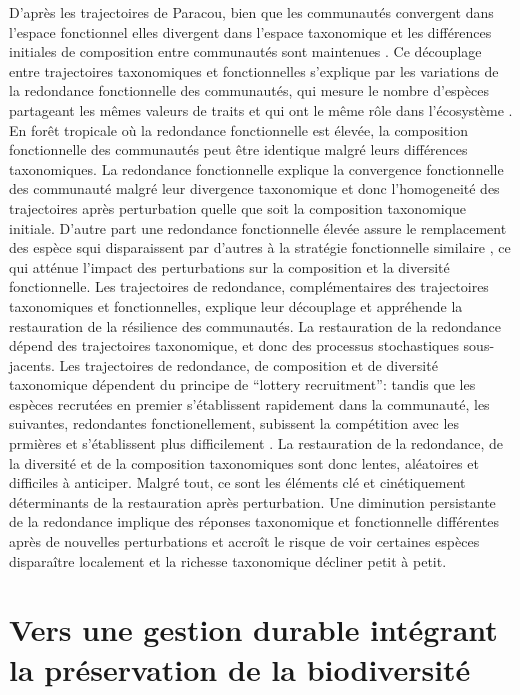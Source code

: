 \documentclass[
  11pt,
  french,
  A4paper,
  extrafontsizes,onecolumn,openright
  ]{memoir}
\begin{document}
D'après les trajectoires de Paracou, bien que les communautés convergent
dans l'espace fonctionnel elles divergent dans l'espace taxonomique et
les différences initiales de composition entre communautés sont
maintenues \autocite{Fukami2005}. Ce découplage entre trajectoires
taxonomiques et fonctionnelles s'explique par les variations de la
redondance fonctionnelle des communautés, qui mesure le nombre d'espèces
partageant les mêmes valeurs de traits et qui ont le même rôle dans
l'écosystème \autocite{Bellwood2006}. En forêt tropicale où la
redondance fonctionnelle est élevée, la composition fonctionnelle des
communautés peut être identique malgré leurs différences taxonomiques.
La redondance fonctionnelle explique la convergence fonctionnelle des
communauté malgré leur divergence taxonomique et donc l'homogeneité des
trajectoires après perturbation quelle que soit la composition
taxonomique initiale. D'autre part une redondance fonctionnelle élevée
assure le remplacement des espèce squi disparaissent par d'autres à la
stratégie fonctionnelle similaire \autocite{Carmona2016}, ce qui atténue
l'impact des perturbations sur la composition et la diversité
fonctionnelle. Les trajectoires de redondance, complémentaires des
trajectoires taxonomiques et fonctionnelles, explique leur découplage et
appréhende la restauration de la résilience des communautés. La
restauration de la redondance dépend des trajectoires taxonomique, et
donc des processus stochastiques sous-jacents. Les trajectoires de
redondance, de composition et de diversité taxonomique dépendent du
principe de ``lottery recruitment'': tandis que les espèces recrutées en
premier s'établissent rapidement dans la communauté, les suivantes,
redondantes fonctionellement, subissent la compétition avec les prmières
et s'établissent plus difficilement \autocite{Busing2002}. La
restauration de la redondance, de la diversité et de la composition
taxonomiques sont donc lentes, aléatoires et difficiles à anticiper.
Malgré tout, ce sont les éléments clé et cinétiquement déterminants de
la restauration après perturbation. Une diminution persistante de la
redondance implique des réponses taxonomique et fonctionnelle
différentes après de nouvelles perturbations et accroît le risque de
voir certaines espèces disparaître localement et la richesse taxonomique
décliner petit à petit.

\section{Vers une gestion durable intégrant la préservation de la
biodiversité}\label{vers-une-gestion-durable-integrant-la-preservation-de-la-biodiversite}
\end{document}
